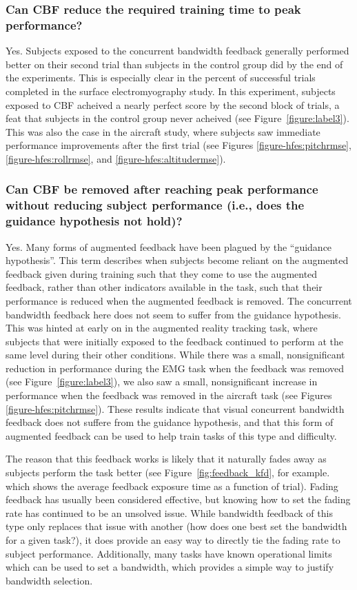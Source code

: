 \subsubsection{Can CBF reduce the required training time to peak performance?}
Yes.
Subjects exposed to the concurrent bandwidth feedback generally performed better on their second trial than subjects in the control group did by the end of the experiments.
This is especially clear in the percent of successful trials completed in the surface electromyography study.
In this experiment, subjects exposed to CBF acheived a nearly perfect score by the second block of trials, a feat that subjects in the control group never acheived (see Figure~\ref{figure:label3}).
This was also the case in the aircraft study, where subjects saw immediate performance improvements after the first trial (see Figures \ref{figure-hfes:pitchrmse}, \ref{figure-hfes:rollrmse}, and \ref{figure-hfes:altitudermse}).

\subsubsection{Can CBF be removed after reaching peak performance without reducing subject performance (i.e., does the guidance hypothesis not hold)?}
Yes.
Many forms of augmented feedback have been plagued by the ``guidance hypothesis''.
This term describes when subjects become reliant on the augmented feedback given during training such that they come to use the augmented feedback, rather than other indicators available in the task, such that their performance is reduced when the augmented feedback is removed.
The concurrent bandwidth feedback here does not seem to suffer from the guidance hypothesis.
This was hinted at early on in the augmented reality tracking task, where subjects that were initially exposed to the feedback continued to perform at the same level during their other conditions.
While there was a small, nonsignificant reduction in performance during the EMG task when the feedback was removed (see Figure~\ref{figure:label3}), we also saw a small, nonsignificant increase in performance when the feedback was removed in the aircraft task (see Figures \ref{figure-hfes:pitchrmse}).
These results indicate that visual concurrent bandwidth feedback does not suffere from the guidance hypothesis, and that this form of augmented feedback can be used to help train tasks of this type and difficulty.

The reason that this feedback works is likely that it naturally fades away as subjects perform the task better (see Figure~\ref{fig:feedback_kfd}, for example. which shows the average feedback exposure time as a function of trial).
Fading feedback has usually been considered effective, but knowing how to set the fading rate has continued to be an unsolved issue.
While bandwidth feedback of this type only replaces that issue with another (how does one best set the bandwidth for a given task?), it does provide an easy way to directly tie the fading rate to subject performance.
Additionally, many tasks have known operational limits which can be used to set a bandwidth, which provides a simple way to justify bandwidth selection.

